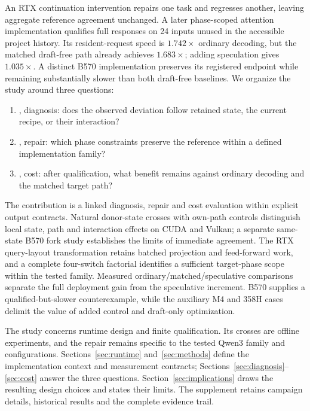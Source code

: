 An RTX continuation intervention repairs one task and regresses another, leaving aggregate reference agreement unchanged. A later phase-scoped attention implementation qualifies full responses on 24 inputs unused in the accessible project history. Its resident-request speed is $1.742\times$ ordinary decoding, but the matched draft-free path already achieves $1.683\times$; adding speculation gives $1.035\times$. A distinct B570 implementation preserves its registered endpoint while remaining substantially slower than both draft-free baselines. We organize the study around three questions:
\begin{enumerate}
\item {}, diagnosis: does the observed deviation follow retained state, the current recipe, or their interaction?
\item {}, repair: which phase constraints preserve the reference within a defined implementation family?
\item {}, cost: after qualification, what benefit remains against ordinary decoding and the matched target path?
\end{enumerate}

The contribution is a linked diagnosis, repair and cost evaluation within explicit output contracts. Natural donor-state crosses with own-path controls distinguish local state, path and interaction effects on CUDA and Vulkan; a separate same-state B570 fork study establishes the limits of immediate agreement. The RTX query-layout transformation retains batched projection and feed-forward work, and a complete four-switch factorial identifies a sufficient target-phase scope within the tested family. Measured ordinary/matched/speculative comparisons separate the full deployment gain from the speculative increment. B570 supplies a qualified-but-slower counterexample, while the auxiliary M4 and 358H cases delimit the value of added control and draft-only optimization.

The study concerns runtime design and finite qualification. Its crosses are offline experiments, and the repair remains specific to the tested Qwen3 family and configurations. Sections~\ref{sec:runtime} and~\ref{sec:methods} define the implementation context and measurement contracts; Sections~\ref{sec:diagnosis}--\ref{sec:cost} answer the three questions. Section~\ref{sec:implications} draws the resulting design choices and states their limits. The supplement retains campaign details, historical results and the complete evidence trail.

